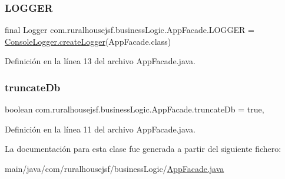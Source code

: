 \mbox{\label{classcom_1_1ruralhousejsf_1_1business_logic_1_1_app_facade_a05d4beab693581eccd0ba740dc222f37}} 
\subsubsection{\texorpdfstring{LOGGER}{LOGGER}}
{\footnotesize\ttfamily final Logger com.\+ruralhousejsf.\+business\+Logic.\+App\+Facade.\+L\+O\+G\+G\+ER = \mbox{\hyperlink{classcom_1_1ruralhousejsf_1_1logger_1_1_console_logger_a520321643663e37d95761134a35505cd}{Console\+Logger.\+create\+Logger}}(App\+Facade.\+class)\hspace{0.3cm}{\ttfamily [static]}}



Definición en la línea 13 del archivo App\+Facade.\+java.

\mbox{\label{classcom_1_1ruralhousejsf_1_1business_logic_1_1_app_facade_ac9cbe77035be5cc1f9bf258c57ca6564}} 
\subsubsection{\texorpdfstring{truncateDb}{truncateDb}}
{\footnotesize\ttfamily boolean com.\+ruralhousejsf.\+business\+Logic.\+App\+Facade.\+truncate\+Db = true\hspace{0.3cm}{\ttfamily [static]}, {\ttfamily [private]}}



Definición en la línea 11 del archivo App\+Facade.\+java.



La documentación para esta clase fue generada a partir del siguiente fichero\+:\begin{DoxyCompactItemize}
\item 
main/java/com/ruralhousejsf/business\+Logic/\mbox{\hyperlink{_app_facade_8java}{App\+Facade.\+java}}\end{DoxyCompactItemize}
